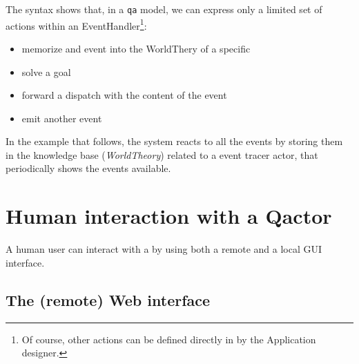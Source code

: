 The syntax shows that, in a \texttt{qa} model, we can express only a limited set of actions within an EventHandler\footnote{Of course, other actions can be defined directly in \java{} by the Application designer.}:

\begin{itemize}
\item memorize and event into the WorldThery of a specific \qa{}
\item solve a goal
\item forward a dispatch with the content of the event
\item emit another event
\end{itemize}

In the example that follows, the system reacts to all the events by storing them in the knowledge base (\textit{WorldTheory}) related to a event tracer actor, that periodically shows the events available.

  



\newpage 
\section{Human interaction with a Qactor}

A human user can interact with a \qa{} by using both a remote and a local GUI interface.

\subsection{The (remote) Web interface}


